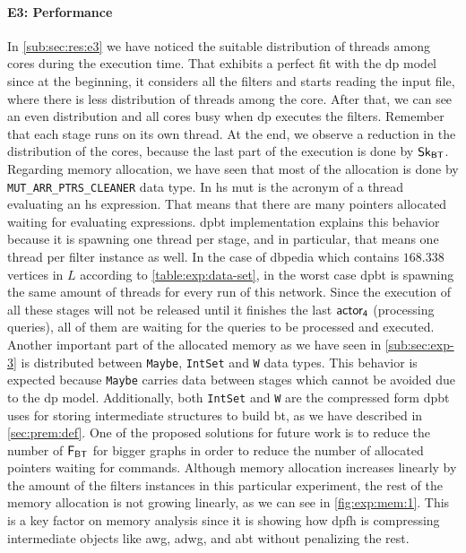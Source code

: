 \paragraph{E3: Performance} In \autoref{sub:sec:res:e3} we have noticed the suitable distribution of threads among cores during the execution time. 
That exhibits a perfect fit with the \acrshort{dp} model since at the beginning, it considers all the filters and starts reading the input file, where there is less distribution of threads among the core. 
After that, we can see an even distribution and all cores busy when \acrshort{dp} executes the filters. Remember that each stage runs on its own thread. At the end, we observe a reduction in the distribution of the cores, because  the last part of the execution is done by $\mathsf{Sk_{BT}}$.
Regarding memory allocation, we have seen that most of the allocation is done by \texttt{MUT\_ARR\_PTRS\_CLEANER} data type.
In \acrlong{hs} \acrshort{mut} is the acronym of a thread evaluating an \acrshort{hs} expression.
That means that there are many pointers allocated waiting for evaluating expressions. \acrshort{dpbt} implementation explains this behavior because it is spawning one
thread per stage, and in particular, that means one thread per filter instance as well. In the case of \acrshort{dbpedia} which contains $168.338$ vertices in 
$L$ according to \autoref{table:exp:data-set}, in the worst case \acrshort{dpbt} is spawning the same amount of threads for every run of this network. Since the execution of all these stages will not be released until it finishes the last $\mathsf{actor_4}$ (processing queries), all of them are waiting for the queries to be processed and executed.
Another important part of the allocated memory as we have seen in \autoref{sub:sec:exp-3} is distributed between \texttt{Maybe}, \texttt{IntSet} and \texttt{W} data types. This behavior is expected because \texttt{Maybe} carries data between stages which cannot be avoided due to the \acrshort{dp} model. Additionally,  both \texttt{IntSet} and \texttt{W} are the 
compressed form \acrshort{dpbt} uses for storing intermediate structures to build \acrshort{bt}, as we have described in \autoref{sec:prem:def}.
One of the proposed solutions for future work is to reduce the number of $\mathsf{F_{BT}}$ for bigger graphs in order to reduce the number of allocated pointers waiting for commands.
Although memory allocation increases linearly by the amount of the filters instances in this particular experiment, the rest of the memory allocation is not growing linearly, as we can see in \autoref{fig:exp:mem:1}. This is a key factor on memory analysis since it is showing how \acrshort{dpfh} is compressing intermediate objects like \acrshort{awg}, \acrshort{adwg}, and \acrshort{abt} without penalizing the rest. 
